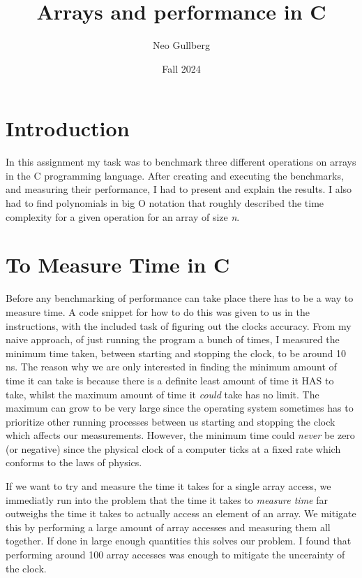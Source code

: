 \documentclass[a4paper, 11pt]{article}
\begin{document}
\title{
	\textbf{Arrays and performance in C}
}
\author{Neo Gullberg}
\date{Fall 2024}
\maketitle

\section{Introduction}
	In this assignment my task was to benchmark three different operations on arrays in the C programming language.
	After creating and executing the benchmarks, and measuring their performance, I had to present and explain the results.
	I also had to find polynomials in big O notation that roughly described the time complexity for a given operation for an array of size \textit{n}.

\section{To Measure Time in C}
	Before any benchmarking of performance can take place there has to be a way to measure time.
	A code snippet for how to do this was given to us in the instructions, with the included task of figuring out the clocks accuracy.
	From my naive approach, of just running the program a bunch of times, I measured the minimum time taken, between starting and stopping the clock, to be around 10 ns.
	The reason why we are only interested in finding the minimum amount of time it can take is because there is a definite least amount of time it HAS to take, whilst the maximum
	amount of time it \textit{could} take has no limit. The maximum can grow to be very large since the operating system sometimes has to prioritize other running processes
	between us starting and stopping the clock which affects our measurements.
	However, the minimum time could \textit{never} be zero (or negative) since the physical clock of a computer ticks at a fixed rate which conforms to the laws of physics.
	\par
	If we want to try and measure the time it takes for a single array access,
	we immediatly run into the problem that the time it takes to \textit{measure time} far outweighs the time it takes to actually access an element of an array.
	We mitigate this by performing a large amount of array accesses and measuring them all together.
	If done in large enough quantities this solves our problem.
	I found that performing around 100 array accesses was enough to mitigate the uncerainty of the clock.
\end{document}

